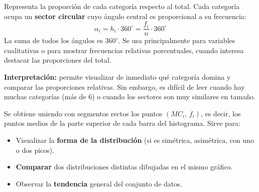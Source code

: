 \documentclass[11pt, letterpaper]{article}
\begin{document}
\begin{tcolorbox}[importantbox, title={Gráfico circular (torta o sectores)}]
Representa la proporción de cada categoría respecto al total. Cada categoría ocupa un \textbf{sector circular} cuyo ángulo central es proporcional a su frecuencia:
\[
\alpha_i = h_i \cdot 360^\circ = \frac{f_i}{n} \cdot 360^\circ
\]
La suma de todos los ángulos es $360^\circ$. Se usa principalmente para variables cualitativas o para mostrar frecuencias relativas porcentuales, cuando interesa destacar las proporciones del total.

\textbf{Interpretación:} permite visualizar de inmediato qué categoría domina y comparar las proporciones relativas. Sin embargo, es difícil de leer cuando hay muchas categorías (más de 6) o cuando los sectores son muy similares en tamaño.
\end{tcolorbox}

\begin{tcolorbox}[importantbox, title={Polígono de frecuencias}]
Se obtiene uniendo con segmentos rectos los puntos $(MC_i,\, f_i)$, es decir, los puntos medios de la parte superior de cada barra del histograma. Sirve para:
\begin{itemize}
  \item Visualizar la \textbf{forma de la distribución} (si es simétrica, asimétrica, con uno o dos picos).
  \item \textbf{Comparar} dos distribuciones distintas dibujadas en el mismo gráfico.
  \item Observar la \textbf{tendencia} general del conjunto de datos.
\end{itemize}
\end{tcolorbox}
\end{document}
